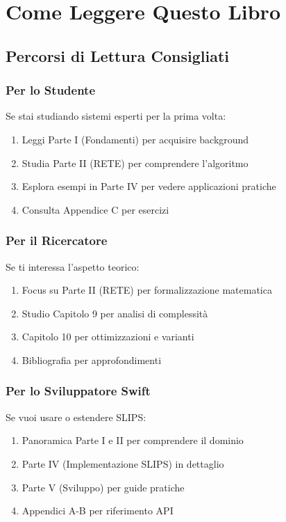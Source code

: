 \section{Come Leggere Questo Libro}

\subsection{Percorsi di Lettura Consigliati}

\subsubsection{Per lo Studente}

Se stai studiando sistemi esperti per la prima volta:
\begin{enumerate}
\item Leggi Parte I (Fondamenti) per acquisire background
\item Studia Parte II (RETE) per comprendere l'algoritmo
\item Esplora esempi in Parte IV per vedere applicazioni pratiche
\item Consulta Appendice C per esercizi
\end{enumerate}

\subsubsection{Per il Ricercatore}

Se ti interessa l'aspetto teorico:
\begin{enumerate}
\item Focus su Parte II (RETE) per formalizzazione matematica
\item Studio Capitolo 9 per analisi di complessità
\item Capitolo 10 per ottimizzazioni e varianti
\item Bibliografia per approfondimenti
\end{enumerate}

\subsubsection{Per lo Sviluppatore Swift}

Se vuoi usare o estendere SLIPS:
\begin{enumerate}
\item Panoramica Parte I e II per comprendere il dominio
\item Parte IV (Implementazione SLIPS) in dettaglio
\item Parte V (Sviluppo) per guide pratiche
\item Appendici A-B per riferimento API
\end{enumerate}

